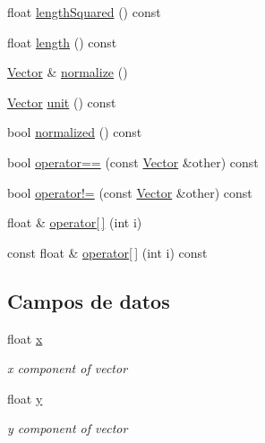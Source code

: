 \begin{DoxyCompactItemize}
\item 
float \hyperlink{classVector_ad7d03652023753f76a5a426abf221128}{length\+Squared} () const 
\item 
float \hyperlink{classVector_a41bd7eef3dfc5832eda40ea2a59bb9f5}{length} () const 
\item 
\hyperlink{classVector}{Vector} \& \hyperlink{classVector_a7586a8c96e492a72418191a0300f3123}{normalize} ()
\item 
\hyperlink{classVector}{Vector} \hyperlink{classVector_aca2765e0e086de29cd95fb97bc384599}{unit} () const 
\item 
bool \hyperlink{classVector_a66636f72a92a9746e6f080593356cae9}{normalized} () const 
\item 
bool \hyperlink{classVector_a164aa24033c4cb6a23fa69902dcbf1f5}{operator==} (const \hyperlink{classVector}{Vector} \&other) const 
\item 
bool \hyperlink{classVector_af7382cb07df79766f0f773f8b64c8312}{operator!=} (const \hyperlink{classVector}{Vector} \&other) const 
\item 
float \& \hyperlink{classVector_a950c7b6666b92ab5b5b9af29e19067c1}{operator\mbox{[}$\,$\mbox{]}} (int i)
\item 
const float \& \hyperlink{classVector_aa5b3b63a6d6dd7f381d37789bec33848}{operator\mbox{[}$\,$\mbox{]}} (int i) const 
\end{DoxyCompactItemize}
\subsection*{Campos de datos}
\begin{DoxyCompactItemize}
\item 
\hypertarget{classVector_aca49165049a1e21ae47afcfc078819ed}{}float \hyperlink{classVector_aca49165049a1e21ae47afcfc078819ed}{x}\label{classVector_aca49165049a1e21ae47afcfc078819ed}

\begin{DoxyCompactList}\small\item\em x component of vector \end{DoxyCompactList}\item 
\hypertarget{classVector_a81be9102fca6d9beea3efef522c4c09d}{}float \hyperlink{classVector_a81be9102fca6d9beea3efef522c4c09d}{y}\label{classVector_a81be9102fca6d9beea3efef522c4c09d}

\begin{DoxyCompactList}\small\item\em y component of vector \end{DoxyCompactList}\end{DoxyCompactItemize}
